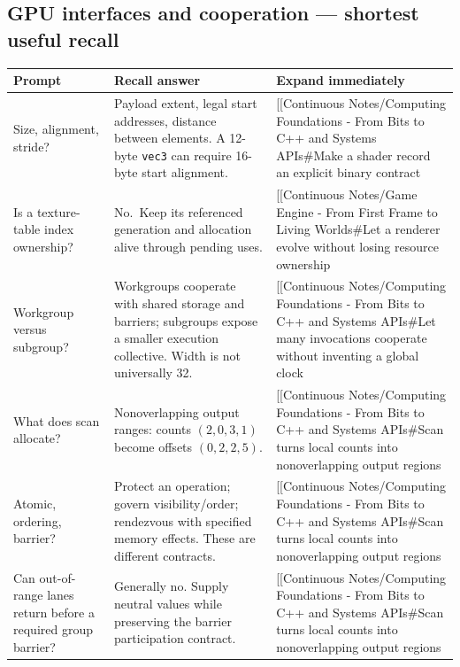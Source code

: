 \subsection{GPU interfaces and cooperation --- shortest useful recall}\label{gpu-interfaces-and-cooperation-shortest-useful-recall}

{\def\LTcaptype{none} %
\begin{longtable}[]{@{}
  >{\raggedright\arraybackslash}p{}
  >{\raggedright\arraybackslash}p{}
  >{\raggedright\arraybackslash}p{}@{}}
\toprule\noalign{}
\begin{minipage}[b]{\linewidth}\raggedright
Prompt
\end{minipage} & \begin{minipage}[b]{\linewidth}\raggedright
Recall answer
\end{minipage} & \begin{minipage}[b]{\linewidth}\raggedright
Expand immediately
\end{minipage} \\
\midrule\noalign{}
\endhead
\bottomrule\noalign{}
\endlastfoot
Size, alignment, stride? & Payload extent, legal start addresses, distance between elements. A 12-byte \texttt{vec3} can require 16-byte start alignment. & {[}{[}Continuous Notes/Computing Foundations - From Bits to C++ and Systems APIs\#Make a shader record an explicit binary contract \\
Is a texture-table index ownership? & No.~Keep its referenced generation and allocation alive through pending uses. & {[}{[}Continuous Notes/Game Engine - From First Frame to Living Worlds\#Let a renderer evolve without losing resource ownership \\
Workgroup versus subgroup? & Workgroups cooperate with shared storage and barriers; subgroups expose a smaller execution collective. Width is not universally 32. & {[}{[}Continuous Notes/Computing Foundations - From Bits to C++ and Systems APIs\#Let many invocations cooperate without inventing a global clock \\
What does scan allocate? & Nonoverlapping output ranges: counts \((2,0,3,1)\) become offsets \((0,2,2,5)\). & {[}{[}Continuous Notes/Computing Foundations - From Bits to C++ and Systems APIs\#Scan turns local counts into nonoverlapping output regions \\
Atomic, ordering, barrier? & Protect an operation; govern visibility/order; rendezvous with specified memory effects. These are different contracts. & {[}{[}Continuous Notes/Computing Foundations - From Bits to C++ and Systems APIs\#Scan turns local counts into nonoverlapping output regions \\
Can out-of-range lanes return before a required group barrier? & Generally no. Supply neutral values while preserving the barrier participation contract. & {[}{[}Continuous Notes/Computing Foundations - From Bits to C++ and Systems APIs\#Scan turns local counts into nonoverlapping output regions \\
\end{longtable}
}

